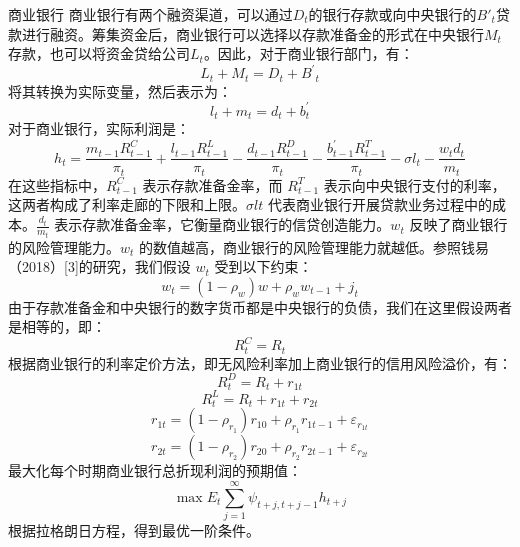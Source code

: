 \documentclass[withoutpreface,bwprint]{cumcmthesis} %
\begin{document}
{\heiti 商业银行} 商业银行有两个融资渠道，可以通过$D_t$的银行存款或向中央银行的$B′_t$贷款进行融资。筹集资金后，商业银行可以选择以存款准备金的形式在中央银行$M_t$存款，也可以将资金贷给公司$L_t$。因此，对于商业银行部门，有：
\begin{equation}
	L_t+M_t=D_t+B^{\prime}{ }_t
\end{equation}
将其转换为实际变量，然后表示为：
\begin{equation}
	l_t+m_t=d_t+b_t^{\prime}
\end{equation}
对于商业银行，实际利润是：
\begin{equation}
	h_t=\frac{m_{t-1} R_{t-1}^C}{\pi_t}+\frac{l_{t-1} R_{t-1}^L}{\pi_t}-\frac{d_{t-1} R_{t-1}^D}{\pi_t}-\frac{b_{t-1}^{\prime} R_{t-1}^T}{\pi_t}-\sigma l_t-\frac{w_t d_t}{m_t}
\end{equation}
在这些指标中，\( R_{t-1}^C \) 表示存款准备金率，而 \( R_{t-1}^T \) 表示向中央银行支付的利率，这两者构成了利率走廊的下限和上限。\( \sigma {lt} \) 代表商业银行开展贷款业务过程中的成本。\( \frac{d_t}{m_t} \) 表示存款准备金率，它衡量商业银行的信贷创造能力。\( w_t \) 反映了商业银行的风险管理能力。\( w_t \) 的数值越高，商业银行的风险管理能力就越低。参照钱易（2018）[3]的研究，我们假设 \( w_t \) 受到以下约束：
\begin{equation}
	w_t=\left(1-\rho_w\right) w+\rho_w w_{t-1}+j_t
\end{equation}
由于存款准备金和中央银行的数字货币都是中央银行的负债，我们在这里假设两者是相等的，即：
\begin{equation}
	R_t^C=R_t
\end{equation}
根据商业银行的利率定价方法，即无风险利率加上商业银行的信用风险溢价，有：
\begin{equation}
	R_t^D=R_t+r_{1 t} 
\end{equation}
\begin{equation}
	R_t^L=R_t+r_{1 t}+r_{2 t} 
\end{equation}
\begin{equation}
	r_{1 t}=\left(1-\rho_{r_1}\right) r_{10}+\rho_{r_1} r_{1 t-1}+\varepsilon_{r_{1 t}} 
\end{equation}
\begin{equation}
	r_{2 t}=\left(1-\rho_{r_2}\right) r_{20}+\rho_{r_2} r_{2 t-1}+\varepsilon_{r_{2 t}}
\end{equation}
最大化每个时期商业银行总折现利润的预期值：
\begin{equation}
	\max E_t \sum_{j=1}^{\infty} \psi_{t+j, t+j-1} h_{t+j}
\end{equation}
根据拉格朗日方程，得到最优一阶条件。
\end{document}
